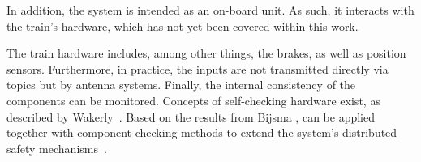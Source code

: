In addition, the system is intended as an  on-board unit.
As such, it interacts with the train's hardware, which has not yet been covered within this work.

The train hardware includes, among other things, the brakes, as well as position sensors.
Furthermore, in practice, the inputs are not transmitted directly via  topics but by antenna systems.
Finally, the internal consistency of the components can be monitored.
Concepts of self-checking hardware exist, as described by Wakerly~\cite{SelfCheckingProcessorDesign}.
Based on the results from Bijsma \etal,  can be applied together with component checking methods to extend the system's distributed safety mechanisms~\cite{DistributedSafety2020}.